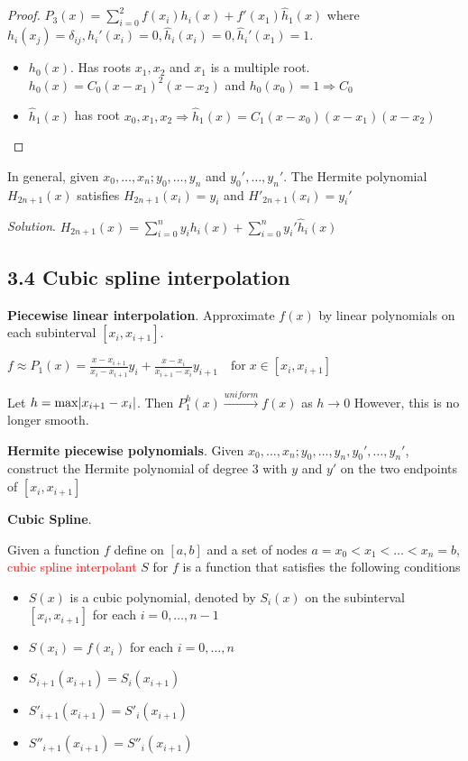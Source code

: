 \documentclass[11pt]{article}
\begin{document}
\begin{proof}
$P_3(x)=\displaystyle\sum_{i=0}^2f(x_i)h_i(x)+f'(x_1)\hat{h}_1(x)$ where
$h_i(x_j)=\delta_{ij},h_i'(x_i)=0,\hat{h}_i(x_i)=0,\hat{h}_i'(x_1)=1$.
\begin{itemize}
\item $h_0(x)$. Has roots $x_1,x_2$ and $x_1$ is a multiple root.
      $h_0(x)=C_0(x-x_1)^2(x-x_2)$ and $h_0(x_0)=1\Longrightarrow C_0$
\item $\hat{h}_1(x)$ has root $x_0,x_1,x_2\Longrightarrow 
      \hat{h}_1(x)=C_1(x-x_0)(x-x_1)(x-x_2)$
\end{itemize}
\end{proof}

In general, given \(x_0,\dots,x_n;y_0,\dots,y_n\) and \(y_0',\dots,y_n'\). The
Hermite polynomial \(H_{2n+1}(x)\) satisfies \(H_{2n+1}(x_i)=y_i\) and
\(H'_{2n+1}(x_i)=y_i'\) 

\emph{Solution}.
\(H_{2n+1}(x)=\displaystyle\sum_{i=0}^ny_ih_i(x)+\displaystyle\sum_{i=0}^ny_i'
   \hat{h}_i(x)\)
\subsection{3.4 Cubic spline interpolation}
\label{sec:org60a5a23}
\textbf{Piecewise linear interpolation}. Approximate \(f(x)\) by linear polynomials on
each subinterval \([x_i,x_{i+1}]\).

\(f\approx P_1(x)=\frac{x-x_{i+1}}{x_i-x_{i+1}}y_i+\frac{x-x_i}
   {x_{i+1}-x_i}y_{i+1} \quad\text{for} \;x\in[x_i,x_{i+1}]\) 

Let \(h=\max\abs{x_{i+1}-x_i}\). Then \(P_1^h(x)\xrightarrow{uniform} f(x)\) as
\(h\to 0\) 
However, this is no longer smooth.

\textbf{Hermite piecewise polynomials}. Given
\(x_0,\dots,x_n;y_0,\dots,y_n,y_0',\dots,y_n'\), construct the Hermite
polynomial of degree 3 with \(y\) and \(y'\) on the two endpoints of
\([x_i,x_{i+1}]\)

\textbf{Cubic Spline}.
\begin{definition}
Given a function $f$ define on $[a,b]$ and a set of nodes $a=x_0<x_1<\dots<x_n=b$,
\textcolor{red}{cubic spline interpolant} $S$ for $f$ is a function that satisfies
the following conditions
\begin{itemize}
\item $S(x)$ is a cubic polynomial, denoted by $S_i(x)$ on the subinterval
$[x_i,x_{i+1}]$ for each $i=0,\dots,n-1$
\item $S(x_i)=f(x_i)$ for each $i=0,\dots, n$
\item $S_{i+1}(x_{i+1})=S_i(x_{i+1})$
\item $S'_{i+1}(x_{i+1})=S'_i(x_{i+1})$
\item $S''_{i+1}(x_{i+1})=S''_i(x_{i+1})$
\end{itemize}
\end{definition}
\end{document}
